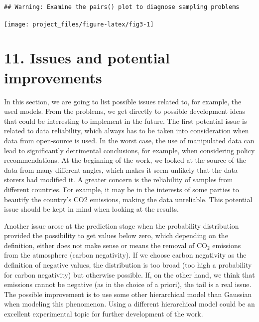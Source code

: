 \documentclass[
]{article}
\begin{document}
\begin{verbatim}
## Warning: Examine the pairs() plot to diagnose sampling problems
\end{verbatim}

\begin{center}\texttt{[image: project\_files/figure-latex/fig3-1]} \end{center}

\hypertarget{issues-and-potential-improvements}{%
\section{11. Issues and potential
improvements}\label{issues-and-potential-improvements}}

In this section, we are going to list possible issues related to, for
example, the used models. From the problems, we get directly to possible
development ideas that could be interesting to implement in the future.
The first potential issue is related to data reliability, which always
has to be taken into consideration when data from open-source is used.
In the worst case, the use of manipulated data can lead to significantly
detrimental conclusions, for example, when considering policy
recommendations. At the beginning of the work, we looked at the source
of the data from many different angles, which makes it seem unlikely
that the data storers had modified it. A greater concern is the
reliability of samples from different countries. For example, it may be
in the interests of some parties to beautify the country's CO2
emissions, making the data unreliable. This potential issue should be
kept in mind when looking at the results.

Another issue arose at the prediction stage when the probability
distribution provided the possibility to get values below zero, which
depending on the definition, either does not make sense or means the
removal of CO\(_2\) emissions from the atmosphere (carbon negativity).
If we choose carbon negativity as the definition of negative values, the
distribution is too broad (too high a probability for carbon negativity)
but otherwise possible. If, on the other hand, we think that emissions
cannot be negative (as in the choice of a priori), the tail is a real
issue. The possible improvement is to use some other hierarchical model
than Gaussian when modeling this phenomenon. Using a different
hierarchical model could be an excellent experimental topic for further
development of the work.
\end{document}
